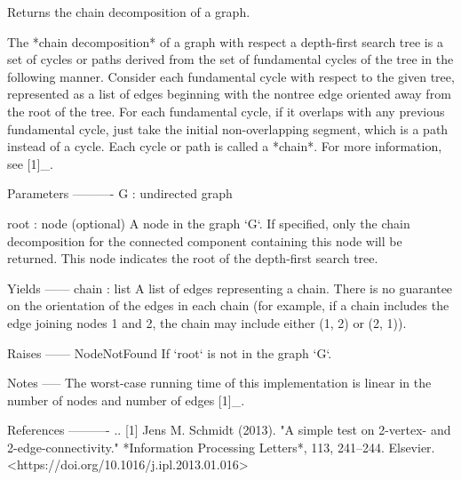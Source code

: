 \begin{DoxyVerb}Returns the chain decomposition of a graph.

The *chain decomposition* of a graph with respect a depth-first
search tree is a set of cycles or paths derived from the set of
fundamental cycles of the tree in the following manner. Consider
each fundamental cycle with respect to the given tree, represented
as a list of edges beginning with the nontree edge oriented away
from the root of the tree. For each fundamental cycle, if it
overlaps with any previous fundamental cycle, just take the initial
non-overlapping segment, which is a path instead of a cycle. Each
cycle or path is called a *chain*. For more information, see [1]_.

Parameters
----------
G : undirected graph

root : node (optional)
   A node in the graph `G`. If specified, only the chain
   decomposition for the connected component containing this node
   will be returned. This node indicates the root of the depth-first
   search tree.

Yields
------
chain : list
   A list of edges representing a chain. There is no guarantee on
   the orientation of the edges in each chain (for example, if a
   chain includes the edge joining nodes 1 and 2, the chain may
   include either (1, 2) or (2, 1)).

Raises
------
NodeNotFound
   If `root` is not in the graph `G`.

Notes
-----
The worst-case running time of this implementation is linear in the
number of nodes and number of edges [1]_.

References
----------
.. [1] Jens M. Schmidt (2013). "A simple test on 2-vertex-
   and 2-edge-connectivity." *Information Processing Letters*,
   113, 241–244. Elsevier. <https://doi.org/10.1016/j.ipl.2013.01.016>\end{DoxyVerb}
 